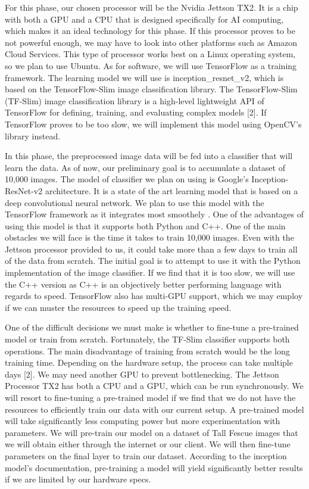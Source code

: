 \documentclass[onecolumn, draftclsnofoot,10pt, compsoc]{IEEEtran}
\begin{document}
For this phase, our chosen processor will be the Nvidia Jettson TX2. It is a chip with both a GPU and a CPU that is designed specifically for AI computing, which makes it an ideal technology for this phase. If this processor proves to be not powerful enough, we may have to look into other platforms such as Amazon Cloud Services. This type of processor works best on a Linux operating system, so we plan to use Ubuntu. As for software, we will use TensorFlow as a training framework. The learning model we will use is inception\_resnet\_v2, which is based on the TensorFlow-Slim image classification library. The TensorFlow-Slim  (TF-Slim) image classification library is a high-level lightweight API of TensorFlow for defining, training, and evaluating complex models [2]. If TensorFlow proves to be too slow, we will implement this model using OpenCV's library instead. 

In this phase, the preprocessed image data will be fed into a classifier that will learn the data. As of now, our preliminary goal is to accumulate a dataset of 10,000 images. The model of classifier we plan on using is Google's Inception-ResNet-v2 architecture. It is a state of the art learning model that is based on a deep convolutional neural network. We plan to use this model with the TensorFlow framework as it integrates most smoothely . One of the advantages of using this model is that it supports both Python and C++. One of the main obstacles we will face is the time it takes to train 10,000 images. Even with the Jettson processor provided to us, it could take more than a few days to train all of the data from scratch. The initial goal is to attempt to use it with the Python implementation of the image classifier. If we find that it is too slow, we will use the C++ version as C++ is an objectively better performing language with regards to speed. TensorFlow also has multi-GPU support, which we may employ if we can muster the resources to speed up the training speed.

One of the difficult decisions we must make is whether to fine-tune a pre-trained model or train from scratch. Fortunately, the TF-Slim classifier supports both operations. The main disadvantage of training from scratch would be the long training time. Depending on the hardware setup, the process can take multiple days [2]. We may need another GPU to prevent bottlenecking. The Jettson Processor TX2 has both a CPU and a GPU, which can be run synchronously. We will resort to fine-tuning a pre-trained model if we find that we do not have the resources to efficiently train our data with our current setup. A pre-trained model will take significantly less computing power but more experimentation with parameters. We will pre-train our model on a dataset of Tall Fescue images that we will obtain either through the internet or our client. We will then fine-tune parameters on the final layer to train our dataset. According to the inception model's documentation, pre-training a model will yield significantly better results if we are limited by our hardware specs. 
\end{document}
